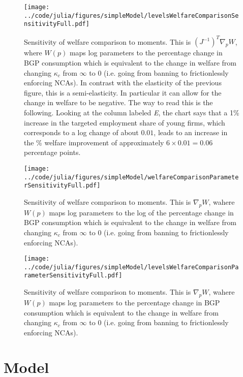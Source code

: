 \documentclass[11pt,english]{article}
\begin{document}
\begin{figure}[!htb]
	\texttt{[image: ../code/julia/figures/simpleModel/levelsWelfareComparisonSensitivityFull.pdf]}
	\caption{Sensitivity of welfare comparison to moments. This is $(J^{-1})^T \nabla_p W$, where $W(p)$ maps log parameters to the percentage change in BGP consumption which is equivalent to the change in welfare from changing $\kappa_c$ from $\infty$ to $0$ (i.e. going from banning to frictionlessly enforcing NCAs). In contrast with the elasticity of the previous figure, this is a semi-elasticity. In particular it can allow for the change in welfare to be negative. The way to read this is the following. Looking at the column labeled \textit{E}, the chart says that a 1\% increase in the targeted employment share of young firms, which corresponds to a log change of about $0.01$, leads to an increase in the \% welfare improvement of approximately $6 \times 0.01 = 0.06$ percentage points.}
	\label{levelsWelfareComparisonSensitivityFull}
\end{figure}

\begin{figure}[]
	\texttt{[image: ../code/julia/figures/simpleModel/welfareComparisonParameterSensitivityFull.pdf]}
	\caption{Sensitivity of welfare comparison to moments. This is $\nabla_p W$, wahere $W(p)$ maps log parameters to the log of the percentage change in BGP consumption which is equivalent to the change in welfare from changing $\kappa_c$ from $\infty$ to $0$ (i.e. going from banning to frictionlessly enforcing NCAs).}
	\label{welfareComparisonParameterSensitivityFull}
\end{figure}

\begin{figure}[]
	\texttt{[image: ../code/julia/figures/simpleModel/levelsWelfareComparisonParameterSensitivityFull.pdf]}
	\caption{Sensitivity of welfare comparison to moments. This is $\nabla_p W$, wahere $W(p)$ maps log parameters to the percentage change in BGP consumption which is equivalent to the change in welfare from changing $\kappa_c$ from $\infty$ to $0$ (i.e. going from banning to frictionlessly enforcing NCAs).}
	\label{levelsWelfareComparisonParameterSensitivityFull}
\end{figure}

\section{Model}\label{appendix:model}
\end{document}
